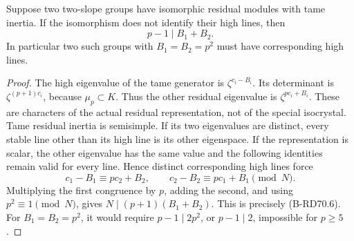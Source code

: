 \begin{lemma}
\label{lem:B-RD70-exchange}
Suppose two two-slope groups have isomorphic residual modules
with tame inertia. If the isomorphism does not identify their
high lines, then
\[
                         p-1\mid B_1+B_2.
 \tag{B-RD70.6}
\]
In particular two such groups with \(B_1=B_2=p^2\) must have
corresponding high lines.
\end{lemma}
\begin{proof}
The high eigenvalue of the tame generator is
\(\zeta^{c_i-B_i}\). Its determinant is
\(\zeta^{(p+1)c_i}\), because \(\mu_p\subset K\).
Thus the other residual eigenvalue is \(\zeta^{pc_i+B_i}\).
These are characters of the actual residual representation,
not of the special isocrystal.
Tame residual inertia is semisimple. If its two eigenvalues
are distinct, every stable line other than its high line
is its other eigenspace. If the representation is scalar,
the other eigenvalue has the same value and the following
identities remain valid for every line. Hence distinct
corresponding high lines force
\[
 c_1-B_1\equiv pc_2+B_2,\qquad
 c_2-B_2\equiv pc_1+B_1\pmod N .
 \tag{B-RD70.7}
\]
Multiplying the first congruence by \(p\), adding the second,
and using \(p^2\equiv1\pmod N\), gives
\(N\mid(p+1)(B_1+B_2)\). This is precisely (B-RD70.6).
For \(B_1=B_2=p^2\), it would require \(p-1\mid2p^2\),
or \(p-1\mid2\), impossible for \(p\ge5\).
\end{proof}

